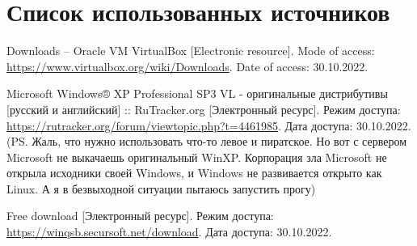 \newpage

\begingroup
  \section*{Список использованных источников}

  \renewcommand{\addcontentsline}[3]{}%
  \renewcommand{\section}[2]{}%

  \begin{thebibliography}{}
    Downloads – Oracle VM VirtualBox
    [Electronic resource].
    Mode of access: \url{https://www.virtualbox.org/wiki/Downloads}.
    Date of access: 30.10.2022.

    Microsoft Windows® XP Professional SP3 VL - оригинальные дистрибутивы [русский и английский] :: RuTracker.org
    [Электронный ресурс].
    Режим доступа: \url{https://rutracker.org/forum/viewtopic.php?t=4461985}.
    Дата доступа: 30.10.2022.
    (PS. Жаль, что нужно использовать что-то левое и пиратское.
    Но вот с сервером Microsoft не выкачаешь оригинальный WinXP.
    Корпорация зла Microsoft не открыла исходники своей Windows,
    и Windows не развивается открыто как Linux.
    А я в безвыходной ситуации пытаюсь запустить прогу)

    Free download
    [Электронный ресурс].
    Режим доступа: \url{https://winqsb.secursoft.net/download}.
    Дата доступа: 30.10.2022. 
  \end{thebibliography}
\endgroup

\begingroup
  \section*{Литература, чтобы писать в \LaTeX}
  \addcontentsline{toc}{section}{Литература, чтобы писать в LaTeX}

  \renewcommand{\addcontentsline}[3]{}%
  \renewcommand{\section}[2]{}%


